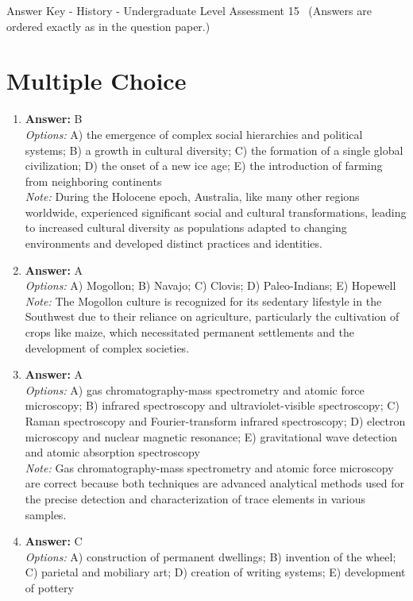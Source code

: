\documentclass[12pt]{article}
\begin{document}
\begin{center}
Answer Key - History - Undergraduate Level Assessment 15 \
\small (Answers are ordered exactly as in the question paper.)
\end{center}

\section*{Multiple Choice}
\begin{enumerate}[label=\arabic*.]
\item \textbf{Answer:} B
\\ \textit{Options:} A) the emergence of complex social hierarchies and political systems; B) a growth in cultural diversity; C) the formation of a single global civilization; D) the onset of a new ice age; E) the introduction of farming from neighboring continents
\\ \textit{Note:} During the Holocene epoch, Australia, like many other regions worldwide, experienced significant social and cultural transformations, leading to increased cultural diversity as populations adapted to changing environments and developed distinct practices and identities.
\item \textbf{Answer:} A
\\ \textit{Options:} A) Mogollon; B) Navajo; C) Clovis; D) Paleo-Indians; E) Hopewell
\\ \textit{Note:} The Mogollon culture is recognized for its sedentary lifestyle in the Southwest due to their reliance on agriculture, particularly the cultivation of crops like maize, which necessitated permanent settlements and the development of complex societies.
\item \textbf{Answer:} A
\\ \textit{Options:} A) gas chromatography-mass spectrometry and atomic force microscopy; B) infrared spectroscopy and ultraviolet-visible spectroscopy; C) Raman spectroscopy and Fourier-transform infrared spectroscopy; D) electron microscopy and nuclear magnetic resonance; E) gravitational wave detection and atomic absorption spectroscopy
\\ \textit{Note:} Gas chromatography-mass spectrometry and atomic force microscopy are correct because both techniques are advanced analytical methods used for the precise detection and characterization of trace elements in various samples.
\item \textbf{Answer:} C
\\ \textit{Options:} A) construction of permanent dwellings; B) invention of the wheel; C) parietal and mobiliary art; D) creation of writing systems; E) development of pottery

\end{enumerate}
\end{document}
